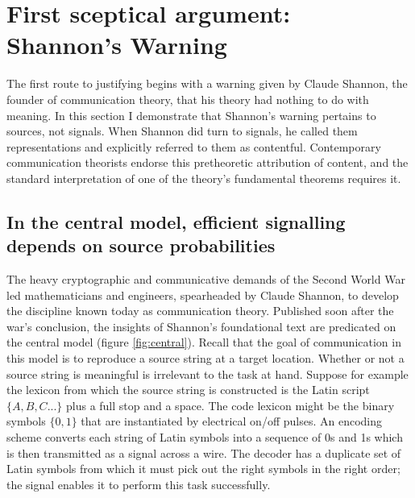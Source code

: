 \documentclass[12pt]{article}
\begin{document}

\section{First sceptical argument: Shannon's Warning}\label{sec:warning}

The first route to justifying \tic{} begins with a warning given by Claude Shannon, the founder of communication theory, that his theory had nothing to do with meaning.
In this section I demonstrate that Shannon's warning pertains to sources, not signals.
When Shannon did turn to signals, he called them representations and explicitly referred to them as contentful.
Contemporary communication theorists endorse this pretheoretic attribution of content, and the standard interpretation of one of the theory's fundamental theorems requires it.



\subsection{In the central model, efficient signalling depends on source probabilities}
The heavy cryptographic and communicative demands of the Second World War led mathematicians and engineers, spearheaded by Claude Shannon, to develop the discipline known today as communication theory.
Published soon after the war's conclusion, the insights of Shannon's foundational text \parencite*{shannon1948mathematicalc} are predicated on the central model (figure \ref{fig:central}).
Recall that the goal of communication in this model is to reproduce a source string at a target location.
Whether or not a source string is meaningful is irrelevant to the task at hand.
Suppose for example the lexicon from which the source string is constructed is the Latin script $\{A,B,C...\}$ plus a full stop and a space.
The code lexicon might be the binary symbols $\{0,1\}$ that are instantiated by electrical on/off pulses.
An encoding scheme converts each string of Latin symbols into a sequence of 0s and 1s which is then transmitted as a signal across a wire.
The decoder has a duplicate set of Latin symbols from which it must pick out the right symbols in the right order; the signal enables it to perform this task successfully.
\end{document}
